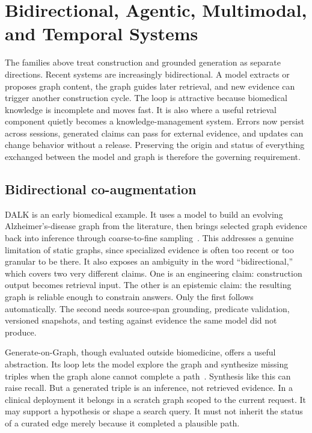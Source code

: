 \section{Bidirectional, Agentic, Multimodal, and Temporal Systems}
\label{sec:bidirectional}

The families above treat construction and grounded generation as separate directions. Recent systems are increasingly bidirectional. A model extracts or proposes graph content, the graph guides later retrieval, and new evidence can trigger another construction cycle. The loop is attractive because biomedical knowledge is incomplete and moves fast. It is also where a useful retrieval component quietly becomes a knowledge-management system. Errors now persist across sessions, generated claims can pass for external evidence, and updates can change behavior without a release. Preserving the origin and status of everything exchanged between the model and graph is therefore the governing requirement.

\subsection{Bidirectional co-augmentation}

DALK is an early biomedical example. It uses a model to build an evolving Alzheimer's-disease graph from the literature, then brings selected graph evidence back into inference through coarse-to-fine sampling~\cite{li2024dalk}. This addresses a genuine limitation of static graphs, since specialized evidence is often too recent or too granular to be there. It also exposes an ambiguity in the word ``bidirectional,'' which covers two very different claims. One is an engineering claim: construction output becomes retrieval input. The other is an epistemic claim: the resulting graph is reliable enough to constrain answers. Only the first follows automatically. The second needs source-span grounding, predicate validation, versioned snapshots, and testing against evidence the same model did not produce.

Generate-on-Graph, though evaluated outside biomedicine, offers a useful abstraction. Its loop lets the model explore the graph and synthesize missing triples when the graph alone cannot complete a path~\cite{xu2024gog}. Synthesis like this can raise recall. But a generated triple is an inference, not retrieved evidence. In a clinical deployment it belongs in a scratch graph scoped to the current request. It may support a hypothesis or shape a search query. It must not inherit the status of a curated edge merely because it completed a plausible path.

